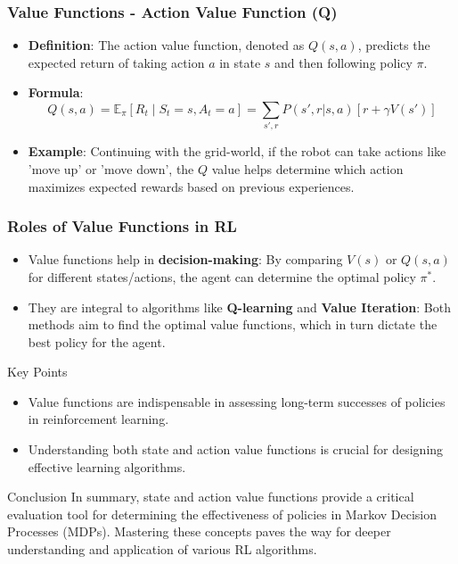\documentclass[aspectratio=169]{beamer}
\begin{document}
\begin{frame}[fragile]
    \frametitle{Value Functions - Action Value Function (Q)}
    \begin{itemize}
        \item \textbf{Definition}: The action value function, denoted as \( Q(s, a) \), predicts the expected return of taking action \( a \) in state \( s \) and then following policy \( \pi \).

        \item \textbf{Formula}:
        \begin{equation}
            Q(s, a) = \mathbb{E}_\pi \left[ R_t \mid S_t = s, A_t = a \right] = \sum_{s', r} P(s', r | s, a) [r + \gamma V(s')]
        \end{equation}
        
        \item \textbf{Example}: Continuing with the grid-world, if the robot can take actions like 'move up' or 'move down', the \( Q \) value helps determine which action maximizes expected rewards based on previous experiences.
    \end{itemize}
\end{frame}

\begin{frame}[fragile]
    \frametitle{Roles of Value Functions in RL}
    \begin{itemize}
        \item Value functions help in \textbf{decision-making}: By comparing \( V(s) \) or \( Q(s, a) \) for different states/actions, the agent can determine the optimal policy \( \pi^* \).
        
        \item They are integral to algorithms like \textbf{Q-learning} and \textbf{Value Iteration}: Both methods aim to find the optimal value functions, which in turn dictate the best policy for the agent.
    \end{itemize}

    \begin{block}{Key Points}
        \begin{itemize}
            \item Value functions are indispensable in assessing long-term successes of policies in reinforcement learning.
            \item Understanding both state and action value functions is crucial for designing effective learning algorithms.
        \end{itemize}
    \end{block}

    \begin{block}{Conclusion}
        In summary, state and action value functions provide a critical evaluation tool for determining the effectiveness of policies in Markov Decision Processes (MDPs). Mastering these concepts paves the way for deeper understanding and application of various RL algorithms.
    \end{block}
\end{frame}
\end{document}
